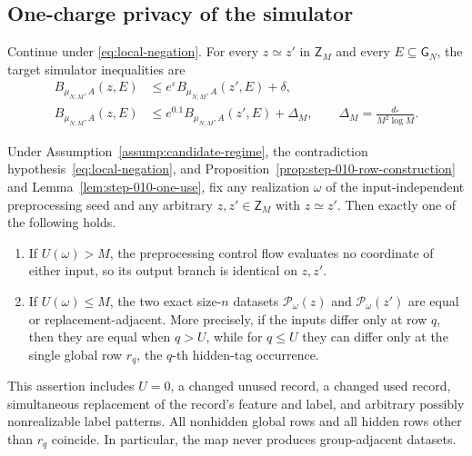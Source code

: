 \subsection{One-charge privacy of the simulator}\label{app:step-012}
Continue under \eqref{eq:local-negation}.  For every
$z\simeq z'$ in $\mathsf Z_M$ and every $E\subseteq\mathsf G_N$, the
target simulator inequalities are
\begin{align}
B_{\mu_{N,M},A}(z,E)
&\le e^\varepsilon B_{\mu_{N,M},A}(z',E)+\delta,
\tag{4}\label{eq:simulator-dp}\\
B_{\mu_{N,M},A}(z,E)
&\le e^{0.1}B_{\mu_{N,M},A}(z',E)+\Delta_M,
\qquad
\Delta_M=\frac{d_*}{M^2\log M}.
\tag{6}\label{eq:simulator-source-cap}
\end{align}
\begin{lemma}\label{lem:step-012-one-row-map}
Under Assumption~\ref{assump:candidate-regime}, the contradiction hypothesis~\eqref{eq:local-negation},
and Proposition~\ref{prop:step-010-row-construction} and
Lemma~\ref{lem:step-010-one-use}, fix any realization \(\omega\) of
the input-independent preprocessing seed and any arbitrary
\(z,z'\in\mathsf Z_M\) with \(z\simeq z'\).  Then exactly one of the
following holds.

\begin{enumerate}
\item If \(U(\omega)>M\), the preprocessing control flow evaluates no
   coordinate of either input, so its output branch is identical on
   \(z,z'\).
\item If \(U(\omega)\le M\), the two exact size-\(n\) datasets
   \(\mathcal P_\omega(z)\) and \(\mathcal P_\omega(z')\) are equal or
   replacement-adjacent.  More precisely, if the inputs differ only at
   row \(q\), then they are equal when \(q>U\), while for \(q\le U\)
   they can differ only at the single global row \(r_q\), the \(q\)-th
   hidden-tag occurrence.
\end{enumerate}

This assertion includes \(U=0\), a changed unused record, a changed used
record, simultaneous replacement of the record's feature and label, and
arbitrary possibly nonrealizable label patterns.  All nonhidden global
rows and all hidden rows other than \(r_q\) coincide.  In particular, the
map never produces group-adjacent datasets.
\end{lemma}


